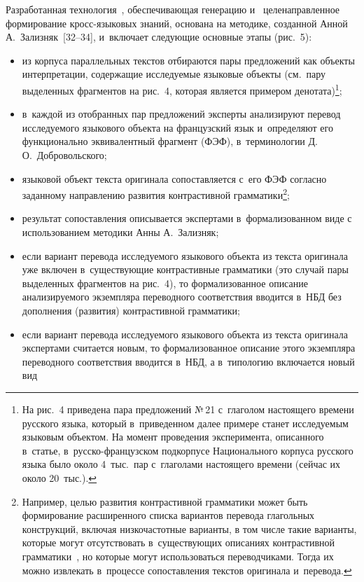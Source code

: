 {\begin{multicols}{2}
      Разработанная технология~\cite{24-zat, 32-zat, 33-zat}, обеспечивающая генерацию и~
целенаправленное формирование кросс-язы\-ко\-вых знаний, основана на методике, 
созданной Анной А.~Зализняк~[32--34], и~включает следующие 
основные этапы (рис.~5):
      \begin{itemize}
\item из корпуса параллельных текстов отбираются пары предложений как 
объекты интерпретации, содержащие исследуемые языковые объекты (см.\ пару 
выделенных фрагментов на рис.~4, которая является примером 
денотата)\footnote{На рис.~4 приведена пара предложений №\,21 с~глаголом настоящего 
времени русского языка, который в~приведенном далее примере станет исследуемым языковым 
объектом. На момент проведения эксперимента, описанного в~статье, в~рус\-ско-фран\-цуз\-ском 
подкорпусе Национального корпуса русского языка было около 4~тыс.\ пар с~глаголами 
настоящего времени (сейчас их около 20~тыс.).};
\item в~каждой из отобранных пар предложений эксперты анализируют перевод 
исследуемого языково\-го объекта на французский язык и~определяют его 
функционально эквивалентный фрагмент (ФЭФ), в~терминологии 
Д.\,О.~Добровольского;
\item языковой объект текста оригинала сопоставляется с~его ФЭФ согласно 
заданному направлению развития контрастивной грамматики\footnote[2]{Например, 
целью развития контрастивной грамматики может быть формирование расширенного списка 
вариантов перевода глагольных конструкций, включая низкочастотные варианты, 
в том числе такие 
варианты, которые могут отсутствовать в~суще\-ст\-ву\-ющих описаниях контрастивной 
грамматики~\cite{35-zat, 36-zat}, но которые могут использоваться переводчиками. Тогда их 
можно извлекать в~процессе сопоставления текстов оригинала и~перевода.};
\item результат сопоставления описывается экспертами в~формализованном виде 
с использованием методики Анны А.~Зализняк;
\item если вариант перевода исследуемого языкового объекта из текста оригинала 
уже включен в~существующие контрастивные грамматики (это случай пары 
выделенных фрагментов на рис.~4), то формализованное описание 
анализируемого экземпляра переводного соответствия вводится в~НБД 
без дополнения (развития) контрастивной грамматики;
\item если вариант перевода исследуемого языкового объекта из текста оригинала 
экспертами считается новым, то формализованное описание этого экземпляра 
переводного соответствия вводится в~НБД, а в~типологию включается новый вид 

\end{itemize}
\end{multicols}}
